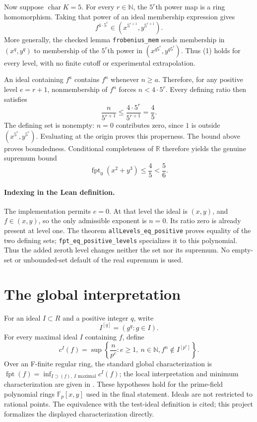 \documentclass[11pt,a4paper]{article}
\newcommand{\lean}[1]{\nolinkurl{#1}}
\newcommand{\F}{\mathbb F}
\newcommand{\fpt}{\operatorname{fpt}}
\begin{document}
Now suppose $\operatorname{char}K=5$. For every $r\in\mathbb N$, the
$5^r$th power map is a ring homomorphism. Taking that power of an ideal
membership expression gives
\[
 f^{4\cdot5^r}\in
 (x^{5^{r+1}},y^{5^{r+1}}).
 \tag{1}
\]
More generally, the checked lemma \lean{frobenius_mem} sends membership
in $(x^q,y^q)$ to membership of the $5^r$th power in
$(x^{q5^r},y^{q5^r})$. Thus (1) holds for every level, with no finite
cutoff or experimental extrapolation.

An ideal containing $f^a$ contains $f^n$ whenever $n\ge a$.
Therefore, for any positive level $e=r+1$, nonmembership of $f^n$
forces $n<4\cdot5^r$. Every defining ratio then satisfies
\[
 \frac{n}{5^{r+1}}\le\frac{4\cdot5^r}{5^{r+1}}=\frac45.
\]
The defining set is nonempty: $n=0$ contributes zero, since $1$ is
outside $(x^{5^e},y^{5^e})$. Evaluating at the origin proves this
properness. The bound above proves boundedness. Conditional completeness
of $\mathbb R$ therefore yields the genuine supremum bound
\[
 \boxed{\fpt_0(x^2+y^3)\le\frac45<\frac56.}
 \tag{2}
\]

\paragraph{Indexing in the Lean definition.}
The implementation permits $e=0$. At that level the ideal is $(x,y)$,
and $f\in(x,y)$, so the only admissible exponent is $n=0$. Its ratio
zero is already present at level one. The theorem
\lean{allLevels_eq_positive} proves equality of the two defining sets;
\lean{fpt_eq_positive_levels} specializes it to this polynomial.
Thus the added zeroth level changes neither the set nor its supremum.
No empty-set or unbounded-set default of the real supremum is used.

\newpage
\section{The global interpretation}
For an ideal $I\subset R$ and a positive integer $q$, write
\[
 I^{[q]}=(g^q:g\in I).
\]
For every maximal ideal $I$ containing $f$, define
\[
 c^I(f)=\sup\left\{\frac{n}{p^e}: e\ge1,\ n\in\mathbb N,
 f^n\notin I^{[p^e]}\right\}.
\]
Over an F-finite regular ring, the standard global characterization is
$\fpt(f)=\inf_{I\supset(f),\ I\text{ maximal}}c^I(f)$;
the local interpretation and minimum characterization are given in
\cite[\S3, Proposition 3.2(iii--iv)]{bms}.
These hypotheses hold for the prime-field polynomial rings $\F_p[x,y]$
used in the final statement. Ideals are not restricted to rational points.
The equivalence with the test-ideal definition is cited; this project
formalizes the displayed characterization directly.
\end{document}
